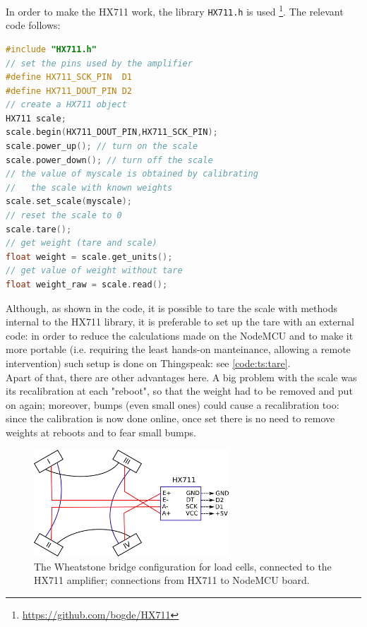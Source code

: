 In order to make the HX711 work, the library \texttt{HX711.h} is used \footnote{\url{https://github.com/bogde/HX711}}. The relevant code follows:
\begin{lstlisting}[language=C]
#include "HX711.h"
// set the pins used by the amplifier
#define HX711_SCK_PIN  D1         
#define HX711_DOUT_PIN D2
// create a HX711 object
HX711 scale;                      
scale.begin(HX711_DOUT_PIN,HX711_SCK_PIN);
scale.power_up(); // turn on the scale
scale.power_down(); // turn off the scale
// the value of myscale is obtained by calibrating 
//   the scale with known weights
scale.set_scale(myscale);         
// reset the scale to 0
scale.tare();                     
// get weight (tare and scale)
float weight = scale.get_units(); 
// get value of weight without tare 
float weight_raw = scale.read();
\end{lstlisting}

\label{topic:scale_tare}
Although, as shown in the code, it is possible to tare the scale with methods internal to the HX711 library, it is preferable to set up the tare with an external code: in order to reduce the calculations made on the NodeMCU and to make it more portable (i.e. requiring the least hands-on manteinance, allowing a remote intervention) such setup is done on Thingspeak: see \autoref{code:ts:tare}. \\
Apart of that, there are other advantages here. A big problem with the scale was its recalibration at each "reboot", so that the weight had to be removed and put on again; moreover, bumps (even small ones) could cause a recalibration too: since the calibration is now done online, once set there is no need to remove weights at reboots and to fear small bumps.  

\begin{figure}[!htb] 
  \centering
  \includegraphics[width=0.65\textwidth]{latex/img/loadcells_scheme.png}
  \caption{The Wheatstone bridge configuration for load cells, connected to the HX711 amplifier; connections from HX711 to NodeMCU board.}\label{img:loadcells_scheme}
\end{figure}


